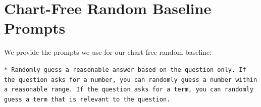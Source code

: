 \section{Chart-Free Random Baseline Prompts}
\label{sec:random_guess_prompt}
We provide the prompts we use for our chart-free random baseline:

\texttt{* Randomly guess a reasonable answer based on the question only. If the question asks for a number, you can randomly guess a number within a reasonable range. If the question asks for a term, you can randomly guess a term that is relevant to the question.}